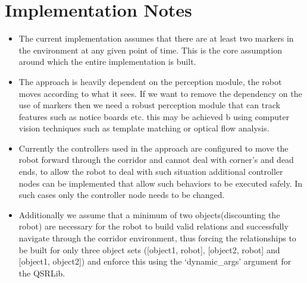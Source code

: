 \section{Implementation Notes}
\begin{itemize}
	\item The current implementation assumes that there are at least two markers in the environment at any given point of time. This is the core assumption around which the entire implementation is built.
	
	\item The approach is heavily dependent on the perception module, the robot moves according to what it sees. If we want to remove the dependency on the use of markers then we need a robust perception module that can track features such as notice boards etc. this may be achieved b using computer vision techniques such as template matching or optical flow analysis.
	
	\item Currently the controllers used in the approach are configured to move the robot forward through the corridor and cannot deal with corner's and dead ends, to allow the robot to deal with such situation additional controller nodes can be implemented that allow such behaviors to be executed safely. In such cases only the controller node needs to be changed. 
	
	\item Additionally we assume that a minimum of two objects(discounting the robot) are necessary for the robot to build valid relations and successfully navigate through the corridor environment, thus forcing the relationships to be built for only three object sets ([object1, robot], [object2, robot] and [object1, object2]) and enforce this using the `dynamic\_args' argument for the QSRLib.
\end{itemize}
